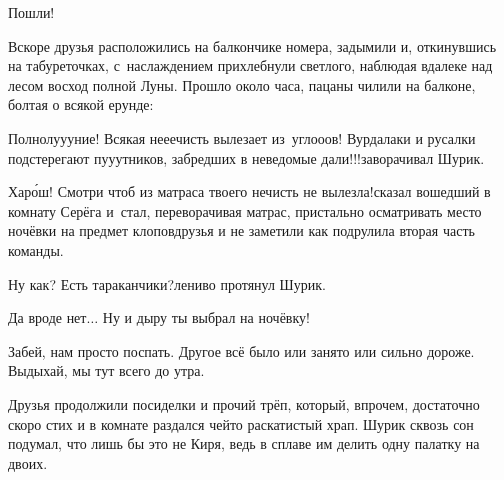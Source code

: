 \diagdash Пошли!

Вскоре друзья расположились на балкончике номера, задымили и, откинувшись на табуреточках, с~наслаждением прихлебнули светлого, наблюдая вдалеке над лесом восход полной Луны. Прошло около часа, пацаны чилили на балконе, болтая о всякой ерунде:

\diagdash Полнолу\sdash у\sdash уние! Всякая не\sdash е\sdash ечисть вылезает из~угло\sdash о\sdash ов! Вурдалаки и русалки подстерегают пу\sdash у\sdash утников, забредших в неведомые дали!!!\mdash заворачивал Шурик.

\diagdash Хар\'{о}ш! Смотри чтоб из матраса твоего нечисть не вылезла!\mdash сказал вошедший в комнату Серёга и~стал, переворачивая матрас, пристально осматривать место ночёвки на предмет клопов\mdash друзья и не заметили как подрулила вторая часть команды.

\diagdash Ну как? Есть тараканчики?\mdash лениво протянул Шурик.

\diagdash Да вроде нет$\ldots$ Ну и дыру ты выбрал на ночёвку! 

\diagdash Забей, нам просто поспать. Другое всё было или занято или сильно дороже. Выдыхай, мы тут всего до утра.

Друзья продолжили посиделки и прочий трёп, который, впрочем, достаточно скоро стих и в комнате раздался чей\sdash то раскатистый храп. Шурик сквозь сон подумал, что лишь бы это не Киря, ведь в сплаве им делить одну палатку на двоих.

\begin{center}
\end{center}